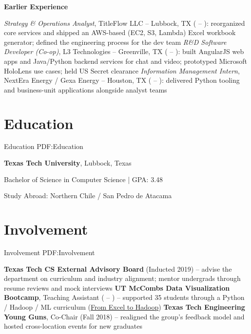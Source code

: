 \documentclass[a4paper,10pt,oneside]{article}
\begin{document}
\begin{body}
\begin{detail}
\end{detail}
\SmallEntryGap
\SmallEntryGap
{\textbf{Earlier Experience}}
\par
\begin{detail}
\BulletItem
\textit{Strategy \& Operations Analyst}, TitleFlow LLC -- Lubbock, TX ( -- ): reorganized core services and shipped an AWS-based (EC2, S3, Lambda) Excel workbook generator; defined the engineering process for the dev team
\BulletItem
\textit{R\&D Software Developer (Co-op)}, L3 Technologies -- Greenville, TX ( -- ): built AngularJS web apps and Java/Python backend services for chat and video; prototyped Microsoft HoloLens use cases; held US Secret clearance
\BulletItem
\textit{Information Management Intern}, NextEra Energy / Gexa Energy -- Houston, TX ( -- ): delivered Python tooling and business-unit applications alongside analyst teams
\end{detail}
\SmallEntryGap
\SmallEntryGap



\section
{Education}
{Education}
{PDF:Education}


{\textbf{Texas Tech University}},
Lubbock, Texas

\SmallEntryGap
Bachelor of Science in Computer Science  | GPA: 3.48
\hfill
\DatestampYMD{}{}{}
\begin{detail}
\Item
Study Abroad: Northern Chile / San Pedro de Atacama
\end{detail}


\section
{Involvement}
{Involvement}
{PDF:Involvement}
\begin{detail}
\BulletItem
\textbf{Texas Tech CS External Advisory Board} (Inducted 2019) -- advise the department on curriculum and industry alignment; mentor undergrads through resume reviews and mock interviews
\BulletItem
\textbf{UT McCombs Data Visualization Bootcamp}, Teaching Assistant ( -- ) -- supported 35 students through a Python / Hadoop / ML curriculum (\href{https://techbootcamps.utexas.edu/data/}{From Excel to Hadoop})
\BulletItem
\textbf{Texas Tech Engineering Young Guns}, Co-Chair (Fall 2018) -- realigned the group's feedback model and hosted cross-location events for new graduates
\end{detail}
\end{body}
\end{document}
